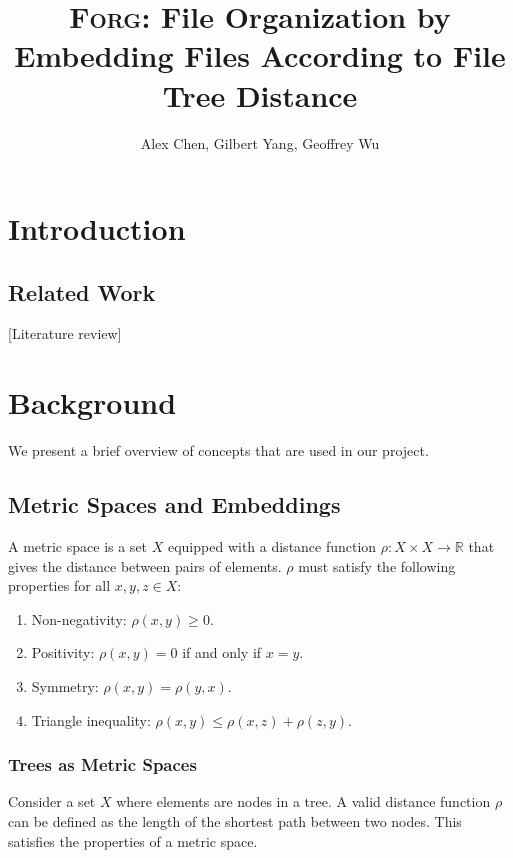 \documentclass{article}
\title{\textsc{Forg}: File Organization by Embedding Files According to File Tree Distance}
\author{Alex Chen, Gilbert Yang, Geoffrey Wu}
\begin{document}
\maketitle

\section{Introduction}

\subsection{Related Work}

[Literature review]

\section{Background}

We present a brief overview of concepts that are used in our project.

\subsection{Metric Spaces and Embeddings}

A metric space is a set $X$ equipped with a distance function $\rho: X \times X \rightarrow \mathbb{R}$ that gives the distance between pairs of elements. $\rho$ must satisfy the following properties for all $x,y,z \in X$:

\begin{enumerate}
  \item Non-negativity: $\rho(x,y) \geq 0$.
  \item Positivity: $\rho(x,y) = 0$ if and only if $x = y$.
  \item Symmetry: $\rho(x,y) = \rho(y,x)$.
  \item Triangle inequality: $\rho(x,y) \leq \rho(x,z) + \rho(z,y)$.
\end{enumerate}

\subsubsection{Trees as Metric Spaces}

Consider a set $X$ where elements are nodes in a tree. A valid distance function $\rho$ can be defined as the length of the shortest path between two nodes. This satisfies the properties of a metric space.
\end{document}
